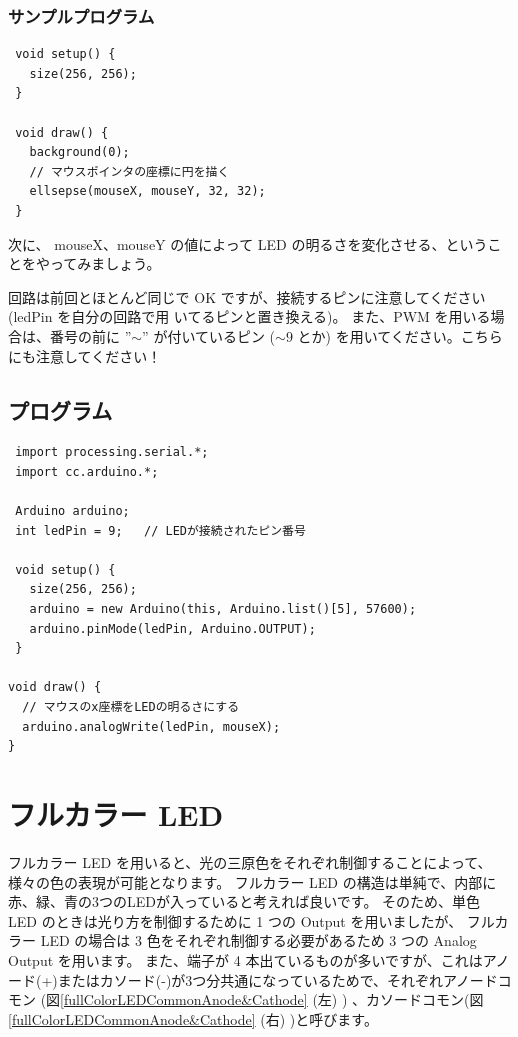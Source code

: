 \documentclass[11pt,a4paper]{jarticle}
\begin{document}
\subsubsection*{サンプルプログラム}
\begin{lstlisting}
 void setup() {
   size(256, 256);
 }

 void draw() {
   background(0);
   // マウスポインタの座標に円を描く
   ellsepse(mouseX, mouseY, 32, 32);
 }
\end{lstlisting}

次に、 mouseX、mouseY の値によって LED の明るさを変化させる、ということをやってみましょう。

回路は前回とほとんど同じで OK ですが、接続するピンに注意してください (ledPin を自分の回路で用
いてるピンと置き換える)。
また、PWM を用いる場合は、番号の前に ''$\sim$'' が付いているピン ($\sim9$ とか) を用いてください。こちらにも注意してください！


\subsection*{プログラム}
\begin{lstlisting}
 import processing.serial.*;
 import cc.arduino.*;
 
 Arduino arduino;
 int ledPin = 9;   // LEDが接続されたピン番号

 void setup() {
   size(256, 256);
   arduino = new Arduino(this, Arduino.list()[5], 57600);
   arduino.pinMode(ledPin, Arduino.OUTPUT);
 }

void draw() {
  // マウスのx座標をLEDの明るさにする 
  arduino.analogWrite(ledPin, mouseX);
}
\end{lstlisting}

\section{フルカラー LED}
フルカラー LED を用いると、光の三原色をそれぞれ制御することによって、様々の色の表現が可能となります。
フルカラー LED の構造は単純で、内部に赤、緑、青の3つのLEDが入っていると考えれば良いです。
そのため、単色 LED のときは光り方を制御するために 1 つの Output を用いましたが、
フルカラー LED の場合は 3 色をそれぞれ制御する必要があるため 3 つの Analog Output を用います。
また、端子が 4 本出ているものが多いですが、これはアノード(+)またはカソード(-)が3つ分共通になっているためで、それぞれアノードコモン (図\ref{fullColorLEDCommonAnode&Cathode} (左) ) 、カソードコモン(図\ref{fullColorLEDCommonAnode&Cathode} (右) )と呼びます。
\end{document}
